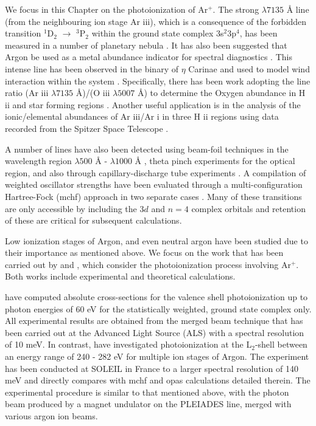 We focus in this Chapter on the photoionization of Ar$^{+}$. The strong $\lambda 7135$ {\AA} line (from the neighbouring ion stage Ar {\sc iii}), which is a consequence of the forbidden transition $^1$D$_2$ $\rightarrow$ $^3$P$_2$ within the ground state complex 3s$^2$3p$^4$, has been measured in a number of planetary nebula \citep{1987ApJS...65..405A}. It has also been suggested that Argon be used as a metal abundance indicator for spectral diagnostics \citep{1980ApJ...240...99B}. This intense line has been observed in the binary of $\eta$ Carinae and used to model wind interaction within the system \citep{2009MNRAS.396.1308G}. Specifically, there has been work adopting the line ratio (Ar {\sc iii} $\lambda 7135$ {\AA})/(O {\sc iii} $\lambda 5007$ {\AA}) to determine the Oxygen abundance in H {\sc ii} and star forming regions \citep{2006A&A...454L.127S}. Another useful application is in the analysis of the ionic/elemental abundances of Ar {\sc iii}/Ar {\sc i} in three H {\sc ii} regions using data recorded from the Spitzer Space Telescope \citep{2008ApJ...680..398L}.

A number of lines have also been detected using beam-foil techniques in the wavelength region $\lambda500$ {\AA} - $\lambda1000$ {\AA} \citep{PINNINGTON:71}, theta pinch experiments \citep{1987JPhB...20..693H} for the optical region, and also through capillary-discharge tube experiments \citep{2000BrJPh..30..386L}. A compilation of weighted oscillator strengths have been evaluated through a multi-configuration Hartree-Fock ({\sc mchf}) approach in two separate cases \citep{2006ADNDT..92..607F, 2001JQSRT..69..171L}. Many of these transitions are only accessible by including the 3$d$ and $n=4$ complex orbitals and retention of these are critical for subsequent calculations.

Low ionization stages of Argon, and even neutral argon have been studied due to their importance as mentioned above. We focus on the work that has been carried out by \citet{2011PhRvA..84a3413C} and \citet{2012PhRvA..85d3408B}, which consider the photoionization process involving Ar$^+$. Both works include experimental and theoretical calculations. 

\citet{2011PhRvA..84a3413C} have computed absolute cross-sections for the valence shell photoionization up to photon energies of 60 eV for the statistically weighted, ground state complex only. All experimental results are obtained from the merged beam technique that has been carried out at the Advanced Light Source (ALS) with a spectral resolution of 10 meV. In contrast, \citet{2012PhRvA..85d3408B} have investigated photoionization at the L$_{2}$-shell between an energy range of 240 - 282 eV for multiple ion stages of Argon. The experiment has been conducted at SOLEIL in France to a larger spectral resolution of 140 meV and directly compares with {\sc mchf} and {\sc opas} calculations detailed therein. The experimental procedure is similar to that mentioned above, with the photon beam produced by a magnet undulator on the PLEIADES line, merged with various argon ion beams. 

